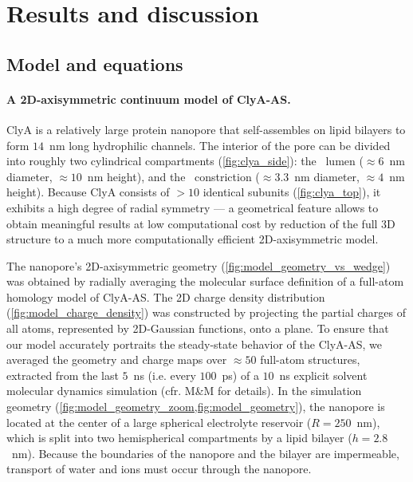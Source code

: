 \documentclass[journal=ancac3,manuscript=article,etalmode=truncate,maxauthors=0,layout=twocolumn]{achemso}
\begin{document}
\section{Results and discussion}\label{sect:results}

\subsection{Model and equations}



\paragraph{A 2D-axisymmetric continuum model of ClyA-AS.}
ClyA is a relatively large protein nanopore that self-assembles on lipid bilayers to form $14$~nm long
hydrophilic channels. The interior of the pore can be divided into roughly two cylindrical compartments
(\cref{fig:clya_side}): the \cis\ lumen ($\approx6$~nm diameter, $\approx10$~nm height), and the \trans\
constriction ($\approx3.3$~nm diameter, $\approx4$~nm height). Because ClyA consists of $>10$ identical
subunits (\cref{fig:clya_top}), it exhibits a high degree of radial symmetry --- a geometrical feature allows
to obtain meaningful results at low computational cost by reduction of the full 3D structure to a much more
computationally efficient 2D-axisymmetric model.\cite{Pederson-2015,Lu-2012}

The nanopore's 2D-axisymmetric geometry (\cref{fig:model_geometry_vs_wedge}) was obtained by radially
averaging the molecular surface definition of a full-atom homology model of ClyA-AS. The 2D charge density
distribution (\cref{fig:model_charge_density}) was constructed by projecting the partial charges of all
atoms, represented by 2D-Gaussian functions, onto a plane. To ensure that our model accurately portraits the
steady-state behavior of the ClyA-AS, we averaged the geometry and charge maps over $\approx50$ full-atom
structures, extracted from the last $5$~ns (i.e. every $100$~ps) of a $10$~ns explicit solvent molecular
dynamics simulation (cfr. M\&M for details). In the simulation geometry
(\cref{fig:model_geometry_zoom,fig:model_geometry}),
the nanopore is located at the center of a large spherical electrolyte reservoir ($R=250$~nm), which is split
into two hemispherical compartments by a lipid bilayer ($h=2.8$~nm). Because the boundaries of the nanopore
and the bilayer are impermeable, transport of water and ions must occur through the nanopore.
\end{document}
